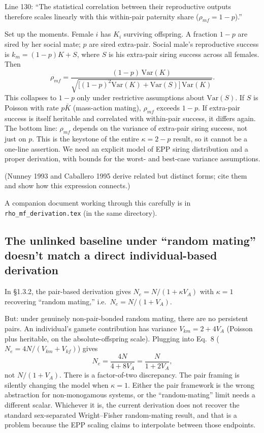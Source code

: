 \documentclass[11pt]{article}
\begin{document}
Line 130: ``The statistical correlation between their reproductive
outputs therefore scales linearly with this within-pair paternity
share ($\rho_{mf} = 1 - p$).''

Set up the moments. Female $i$ has $K_i$ surviving offspring. A
fraction $1-p$ are sired by her social mate; $p$ are sired
extra-pair. Social male's reproductive success is
$k_m = (1-p)K + S$, where $S$ is his extra-pair siring success across
all females. Then
\[
\rho_{mf}
= \frac{(1-p)\,\mathrm{Var}(K)}{\sqrt{\big[(1-p)^2\mathrm{Var}(K) + \mathrm{Var}(S)\big]\,\mathrm{Var}(K)}}.
\]
This collapses to $1-p$ only under restrictive assumptions about
$\mathrm{Var}(S)$. If $S$ is Poisson with rate $p\bar K$ (mass-action
mating), $\rho_{mf}$ exceeds $1-p$. If extra-pair success is itself
heritable and correlated with within-pair success, it differs again.
The bottom line: $\rho_{mf}$ depends on the variance of extra-pair
siring success, not just on $p$. This is the keystone of the entire
$\kappa = 2-p$ result, so it cannot be a one-line assertion. We need
an explicit model of EPP siring distribution and a proper derivation,
with bounds for the worst- and best-case variance assumptions.

(Nunney 1993 and Caballero 1995 derive related but distinct forms;
cite them and show how this expression connects.)

A companion document working through this carefully is in
\texttt{rho\_mf\_derivation.tex} (in the same directory).

\subsection{The unlinked baseline under ``random mating'' doesn't match a direct individual-based derivation}

In \S 1.3.2, the pair-based derivation gives $N_e = N/(1+\kappa V_A)$
with $\kappa=1$ recovering ``random mating,'' i.e.\ $N_e = N/(1+V_A)$.

But: under genuinely non-pair-bonded random mating, there are no
persistent pairs. An individual's gamete contribution has variance
$V_{km} = 2 + 4V_A$ (Poisson plus heritable, on the absolute-offspring
scale). Plugging into Eq.~8 ($N_e = 4N/(V_{km}+V_{kf})$) gives
\[
N_e = \frac{4N}{4 + 8V_A} = \frac{N}{1+2V_A},
\]
not $N/(1+V_A)$. There is a factor-of-two discrepancy. The pair
framing is silently changing the model when $\kappa=1$. Either the
pair framework is the wrong abstraction for non-monogamous systems,
or the ``random-mating'' limit needs a different scalar. Whichever it
is, the current derivation does not recover the standard
sex-separated Wright--Fisher random-mating result, and that is a
problem because the EPP scaling claims to interpolate between those
endpoints.
\end{document}
